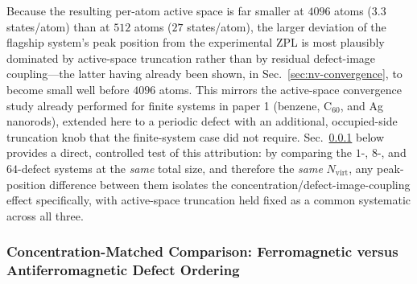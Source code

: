 Because the resulting per-atom active space is far smaller at $4096$
atoms ($3.3$ states/atom) than at $512$ atoms ($27$ states/atom), the
larger deviation of the flagship system's peak position from the
experimental ZPL is most plausibly dominated by active-space
truncation rather than by residual defect-image coupling---the latter
having already been shown, in Sec.~\ref{sec:nv-convergence}, to become
small well before $4096$ atoms. This mirrors the active-space
convergence study already performed for finite systems in paper 1
(benzene, C$_{60}$, and Ag nanorods), extended here to a periodic
defect with an additional, occupied-side truncation knob that the
finite-system case did not require. Sec.~\ref{sec:nv-fm-afm} below
provides a direct, controlled test of this attribution: by comparing
the $1$-, $8$-, and $64$-defect systems at the \emph{same} total size,
and therefore the \emph{same} $N_{\mathrm{virt}}$, any peak-position
difference between them isolates the concentration/defect-image-coupling
effect specifically, with active-space truncation held fixed as a
common systematic across all three.

\subsubsection{Concentration-Matched Comparison: Ferromagnetic versus Antiferromagnetic Defect Ordering}
\label{sec:nv-fm-afm}

